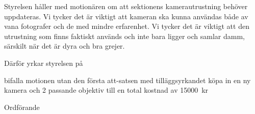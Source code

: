 \documentclass[../_main/handlingar.tex]{subfiles}
\begin{document}
\motionssvar

Styrelsen håller med motionären om att sektionens kamerautrustning behöver uppdateras. Vi tycker det är viktigt att kameran ska kunna användas både av vana fotografer och de med mindre erfarenhet. Vi tycker det är viktigt att den utrustning som finns faktiskt används och inte bara ligger och samlar damm, särskilt när det är dyra och bra grejer. 

Därför yrkar styrelsen på 

\begin{attsatser}
    \att bifalla motionen utan den första att-satsen med tilläggsyrkandet
    \att köpa in en ny kamera och 2 passande objektiv till en total kostnad av \SI{15 000}{kr}
\end{attsatser}

\begin{signatures}{1}
    \ist
    \signature{Daniel Bakic}{Ordförande}
\end{signatures}
\end{document}
